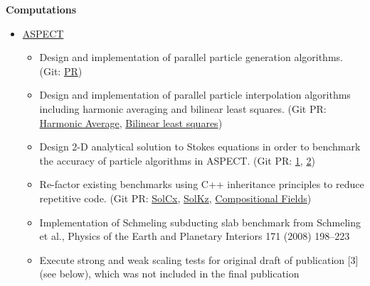 \documentclass[11pt]{ltxdoc}
\begin{document}
\begin{description}
\begin{description}
\begin{itemize}
\begin{itemize}
        \end{itemize}
  
      \end{itemize}  

    \item[] \textbf{Computations}
    
      \vskip 06pt
      

      \begin{itemize}
      	
        \item \href{https://geodynamics.org/cig/software/aspect/}{ASPECT}
              
          \begin{itemize}        
            
            \item Design and implementation of parallel particle generation algorithms. (Git: \href{https://github.com/geodynamics/aspect/pull/1266}{PR})
           
            \item Design and implementation of parallel particle interpolation algorithms including harmonic averaging and bilinear least squares. (Git PR: \href{https://github.com/geodynamics/aspect/pull/1949}{Harmonic Average}, \href{https://github.com/geodynamics/aspect/pull/1554}{Bilinear least squares})
           
            \item Design 2-D analytical solution to Stokes equations in order to benchmark the accuracy of particle algorithms in ASPECT. (Git PR: \href{https://github.com/EGP-CIG-REU/aspect/tree/EGP_HVL_benchmark/benchmark/egp_hvl}{1}, \href{https://github.com/EGP-CIG-REU/aspect/tree/simple_annulus_benchmark/benchmarks/simple_annulus}{2})
           
            \item Re-factor existing benchmarks using C++ inheritance principles to reduce repetitive code. (Git PR: \href{https://github.com/geodynamics/aspect/pull/1498}{SolCx}, \href{https://github.com/geodynamics/aspect/pull/1539}{SolKz}, \href{https://github.com/geodynamics/aspect/pull/1345}{Compositional Fields})
            
            \item Implementation of Schmeling subducting slab benchmark from Schmeling et al., Physics of the Earth and Planetary Interiors 171 (2008) 198--223 
            
            \item Execute strong and weak scaling tests for original draft of publication [3] (see below), which was not included in the final publication              
            

\end{itemize}
\end{itemize}
\end{description}
\end{description}
\end{document}
